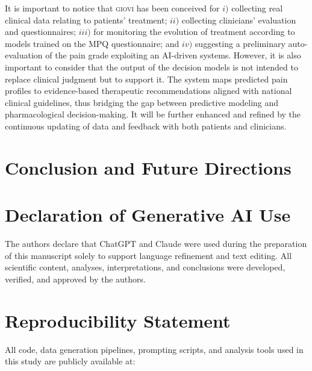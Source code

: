 \documentclass[preprint,12pt,authoryear]{elsarticle}
\newcommand{\system}{\small\textsc{giovi}\xspace}
\begin{document}
It is important to notice that \system has been conceived for $i)$ collecting real clinical data relating to patients' treatment; $ii)$ collecting clinicians' evaluation and questionnaires; $iii)$ for monitoring the evolution of treatment according to models trained on the MPQ questionnaire; and $iv)$ suggesting a preliminary auto-evaluation of the pain grade exploiting an AI-driven systems. However, it is also important to consider that the output of the decision models is not intended to replace clinical judgment but to support it. The system maps predicted pain profiles to evidence-based therapeutic recommendations aligned with national clinical guidelines, thus bridging the gap between predictive modeling and pharmacological decision-making. It will be further enhanced and refined by the continuous updating of data and feedback with both patients and clinicians.






\section{Conclusion and Future Directions\label{sec:conclusion}}


\section*{Declaration of Generative AI Use}

The authors declare that ChatGPT and Claude were used during the preparation of this manuscript solely to support language refinement and text editing. All scientific content, analyses, interpretations, and conclusions were developed, verified, and approved by the authors.

\section*{Reproducibility Statement}

All code, data generation pipelines, prompting scripts, and analysis tools used in this study are publicly available at:
\end{document}
